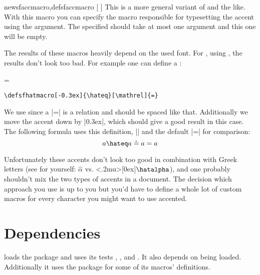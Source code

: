 \begin{describemacro}{newsfaccmacro,defsfaccmacro}%
  [%
    \hspace{0pt}%
  ]
  This is a more general variant of  and the like. With this
  macro you can specify the macro responsible for typesetting the accent using
  the  argument. The specified  should take at most
  one argument and this one will be empty.
\end{describemacro}%

The results of these macros heavily depend on the used font. For
, using , the results don't look too bad. For
example one can define a :

\begingroup
{}\hateq[\mathrel]=
\begin{verbatim}
\defsfhatmacro[-0.3ex]{\hateq}[\mathrel]{=}
\end{verbatim}%
We use  since a |=| is a relation and should be spaced like that.
Additionally we move the accent down by |0.3ex|, which should give a good result
in this case. The following formula uses this  definition,
|\mathrel{\hat{=}}| and the default |=| for comparison:
\begin{equation*}
  a\hateq a \mathrel{\hat{=}} a = a
\end{equation*}
\endgroup

Unfortunately these accents don't look too good in combination with Greek
letters (see for yourself: $\hat{\alpha}$ vs.
\begingroup{}<.2mu>[0ex]\hatalpha\alpha$\hatalpha$\endgroup), and
one probably shouldn't mix the two types of accents in a document. The decision
which approach you use is up to you but you'd have to define a whole lot of
custom macros for every character you might want to use accented.

\section{Dependencies}
 loads the  package and uses its tests
, ,  and
. It also depends on  being loaded.
Additionally it uses the  package for some of its macros'
definitions.


